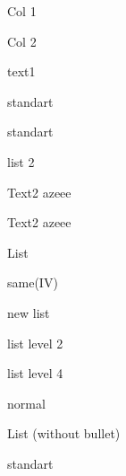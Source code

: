 \documentclass[11pt,a4paper]{article}
\begin{document}
Col 1

Col 2

text1

standart

standart

list 2

Text2   azeee

Text2   azeee

List

same(IV)

new list

list level 2

list level 4

normal

List (without bullet)

standart
\end{document}
